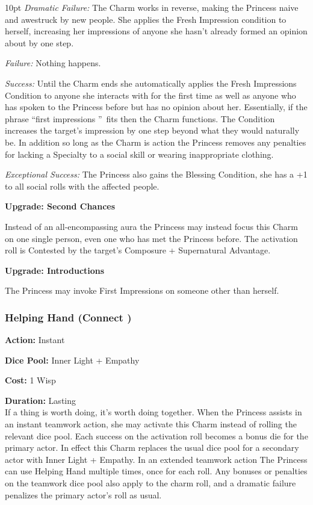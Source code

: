 \begin{myindentpar}{10pt} \emph{Dramatic Failure:} The Charm works in reverse, making the Princess naive and awestruck by new people. She applies the Fresh Impression condition to herself, increasing her impressions of anyone she hasn't already formed an opinion about by one step. 

    \emph{Failure:} Nothing happens. 

    \emph{Success:} Until the Charm ends she automatically applies the Fresh Impressions Condition to anyone she interacts with for the first time as well as anyone who has spoken to the Princess before but has no opinion about her. Essentially, if the phrase \textquotedblleft first impressions \textquotedblright\, fits then the Charm functions. The Condition increases the target's impression by one step beyond what they would naturally be. In addition so long as the Charm is action the Princess removes any penalties for lacking a Specialty to a social skill or wearing inappropriate clothing. 

    \emph{Exceptional Success:} The Princess also gains the Blessing Condition, she has a +1 to all social rolls with the affected people. 
    
    \textbf{Upgrade: Second Chances}

Instead of an all-encompassing aura the Princess may instead focus this Charm on one single person, even one who has met the Princess before. The activation roll is Contested by the target's Composure + Supernatural Advantage. 

    \textbf{Upgrade: Introductions}
    
    The Princess may invoke First Impressions on someone other than herself. 

\end{myindentpar}

\subsubsection*{Helping Hand (Connect \textbullet)}

\noindent \textbf{Action:} Instant

\noindent \textbf{Dice Pool:} Inner Light + Empathy

\noindent \textbf{Cost:} 1 Wisp

\noindent \textbf{Duration:} Lasting\\

\noindent  If a thing is worth doing, it's worth doing together. When the Princess assists in an instant teamwork action, she may activate this Charm instead of rolling the relevant dice pool. Each success on the activation roll becomes a bonus die for the primary actor. In effect this Charm replaces the usual dice pool for a secondary actor with Inner Light + Empathy. In an extended teamwork action The Princess can use Helping Hand multiple times, once for each roll. Any bonuses or penalties on the teamwork dice pool also apply to the charm roll, and a dramatic failure penalizes the primary actor's roll as usual.

